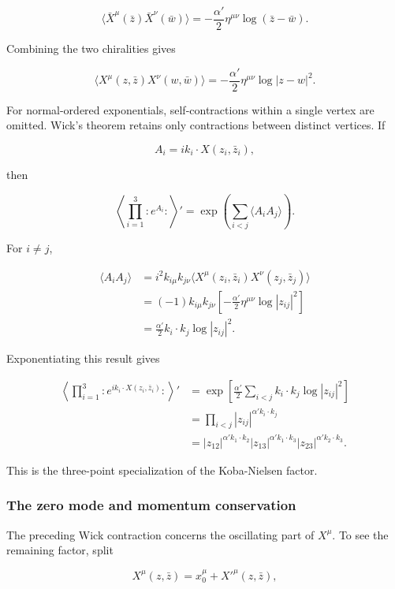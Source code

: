 \documentclass[
  10pt,
  a4paper,
  openany]{book}
\begin{document}
\[
\langle\bar X^\mu(\bar z)\bar X^\nu(\bar w)\rangle
=-\frac{\alpha'}2\eta^{\mu\nu}\log(\bar z-\bar w).
\]

Combining the two chiralities gives

\[
\langle X^\mu(z,\bar z)X^\nu(w,\bar w)\rangle
=-\frac{\alpha'}2\eta^{\mu\nu}\log|z-w|^2.
\]

For normal-ordered exponentials, self-contractions within a single
vertex are omitted. Wick's theorem retains only contractions between
distinct vertices. If

\[
A_i=ik_i\cdot X(z_i,\bar z_i),
\]

then

\[
\left\langle\prod_{i=1}^3:e^{A_i}:\right\rangle'
=
\exp\left(\sum_{i<j}\langle A_iA_j\rangle\right).
\]

For \(i\neq j\),

\[
\begin{aligned}
\langle A_iA_j\rangle
&=i^2 k_{i\mu}k_{j\nu}
\langle X^\mu(z_i,\bar z_i)X^\nu(z_j,\bar z_j)\rangle\\
&=(-1)k_{i\mu}k_{j\nu}
\left[-\frac{\alpha'}2\eta^{\mu\nu}\log|z_{ij}|^2\right]\\
&=\frac{\alpha'}2 k_i\cdot k_j\log|z_{ij}|^2.
\end{aligned}
\]

Exponentiating this result gives

\[
\begin{aligned}
\left\langle
\prod_{i=1}^3:e^{ik_i\cdot X(z_i,\bar z_i)}:
\right\rangle'
&=\exp\left[
\frac{\alpha'}2
\sum_{i<j}k_i\cdot k_j\log|z_{ij}|^2
\right]\\
&=\prod_{i<j}|z_{ij}|^{\alpha'k_i\cdot k_j}\\
&=|z_{12}|^{\alpha'k_1\cdot k_2}
|z_{13}|^{\alpha'k_1\cdot k_3}
|z_{23}|^{\alpha'k_2\cdot k_3}.
\end{aligned}
\]

This is the three-point specialization of the Koba-Nielsen factor.

\subsubsection{The zero mode and momentum
conservation}\label{the-zero-mode-and-momentum-conservation}

The preceding Wick contraction concerns the oscillating part of
\(X^\mu\). To see the remaining factor, split

\[
X^\mu(z,\bar z)=x_0^\mu+X'^\mu(z,\bar z),
\]
\end{document}

